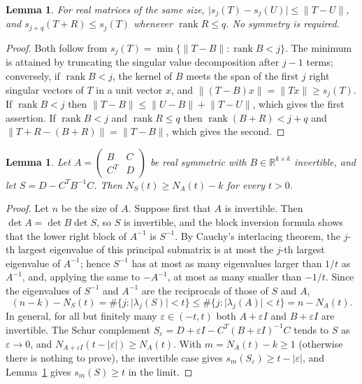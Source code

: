 \documentclass[11pt]{amsart}
\numberwithin{equation}{section}
\newtheorem{lemma}[theorem]{Lemma}
\theoremstyle{definition}
\theoremstyle{remark}
\newcommand{\R}{\mathbb R}
\newcommand{\1}{\mathbf 1}
\DeclareMathOperator{\rank}{rank}
\newcommand{\norm}[1]{\lVert #1\rVert}
\newcommand{\abs}[1]{\lvert #1\rvert}
\begin{document}
\begin{lemma}\label{lem:weyl}
For real matrices of the same size, $\abs{s_j(T)-s_j(U)}\le\norm{T-U}$, and $s_{j+q}(T+R)\le s_j(T)$ whenever $\rank R\le q$. No symmetry is required.
\end{lemma}

\begin{proof}
Both follow from $s_j(T)=\min\{\norm{T-B}:\rank B<j\}$. The minimum is attained by truncating the singular value decomposition after $j-1$ terms; conversely, if $\rank B<j$, the kernel of $B$ meets the span of the first $j$ right singular vectors of $T$ in a unit vector $x$, and $\norm{(T-B)x}=\norm{Tx}\ge s_j(T)$. If $\rank B<j$ then $\norm{T-B}\le\norm{U-B}+\norm{T-U}$, which gives the first assertion. If $\rank B<j$ and $\rank R\le q$ then $\rank(B+R)<j+q$ and $\norm{T+R-(B+R)}=\norm{T-B}$, which gives the second.
\end{proof}

\begin{lemma}\label{lem:schur}
Let $A=\begin{pmatrix}B&C\\C^T&D\end{pmatrix}$ be real symmetric with $B\in\R^{k\times k}$ invertible, and let $S=D-C^TB^{-1}C$. Then $N_S(t)\ge N_A(t)-k$ for every $t>0$.
\end{lemma}

\begin{proof}
Let $n$ be the size of $A$. Suppose first that $A$ is invertible. Then $\det A=\det B\det S$, so $S$ is invertible, and the block inversion formula shows that the lower right block of $A^{-1}$ is $S^{-1}$. By Cauchy's interlacing theorem, the $j$-th largest eigenvalue of this principal submatrix is at most the $j$-th largest eigenvalue of $A^{-1}$; hence $S^{-1}$ has at most as many eigenvalues larger than $1/t$ as $A^{-1}$, and, applying the same to $-A^{-1}$, at most as many smaller than $-1/t$. Since the eigenvalues of $S^{-1}$ and $A^{-1}$ are the reciprocals of those of $S$ and $A$,
\[
(n-k)-N_S(t)=\#\{j:\abs{\lambda_j(S)}<t\}\le\#\{j:\abs{\lambda_j(A)}<t\}=n-N_A(t).
\]
In general, for all but finitely many $\varepsilon\in(-t,t)$ both $A+\varepsilon I$ and $B+\varepsilon I$ are invertible. The Schur complement $S_\varepsilon=D+\varepsilon I-C^T(B+\varepsilon I)^{-1}C$ tends to $S$ as $\varepsilon\to0$, and $N_{A+\varepsilon I}(t-\abs\varepsilon)\ge N_A(t)$. With $m=N_A(t)-k\ge1$ (otherwise there is nothing to prove), the invertible case gives $s_m(S_\varepsilon)\ge t-\abs\varepsilon$, and Lemma~\ref{lem:weyl} gives $s_m(S)\ge t$ in the limit.
\end{proof}
\end{document}
